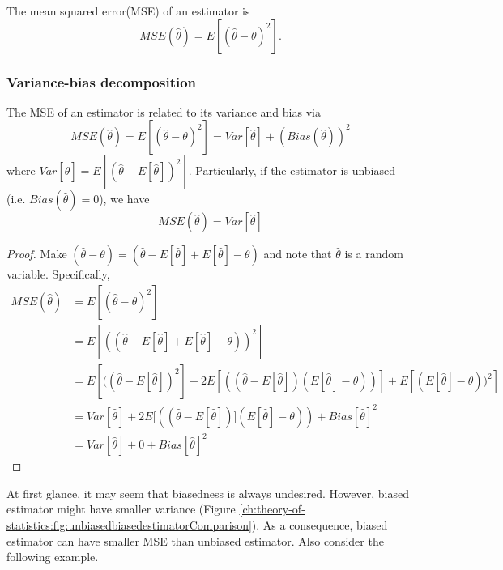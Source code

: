 \begin{refsection}
\begin{definition}
The mean squared error(MSE) of an estimator is $$MSE(\hat{\theta}) = E[(\hat{\theta}-\theta)^2].$$
\end{definition}





\subsubsection{Variance-bias decomposition}
\begin{theorem}
The MSE of an estimator is related to its variance and bias via
\begin{equation}
 MSE(\hat{\theta}) = E[(\hat{\theta}-\theta)^2]=Var[\hat{\theta}] + (Bias(\hat{\theta}))^2
\end{equation}
where $Var[\hat{\theta}] = E[(\hat{\theta} - E[\hat{\theta}])^2]$. Particularly, if the estimator is unbiased (i.e. $Bias(\hat{\theta}) = 0$), we have
$$MSE(\hat{\theta}) =Var[\hat{\theta}]$$
\end{theorem}
\begin{proof}
Make $(\hat{\theta}-\theta) = (\hat{\theta}-E[\hat{\theta}] + E[\hat{\theta}] - \theta)$ and note that $\hat{\theta}$ is a random variable.
Specifically,
\begin{align*}
MSE(\hat{\theta}) & = E[(\hat{\theta}-\theta)^2] \\
				  & = E[((\hat{\theta}-E[\hat{\theta}] + E[\hat{\theta}] - \theta))^2] \\
				  & = E[((\hat{\theta}-E[\hat{\theta}])^2] + 2E[((\hat{\theta}-E[\hat{\theta}])(E[\hat{\theta}] - \theta))] + E[(E[\hat{\theta}] - \theta))^2]\\
				  & = Var[\hat{\theta}] + 2E[((\hat{\theta}-E[\hat{\theta}])](E[\hat{\theta}] - \theta)) + Bias[\hat{\theta}]^2 \\
				  & = Var[\hat{\theta}] + 0 + Bias[\hat{\theta}]^2
\end{align*}	
\end{proof}

\begin{remark}
At first glance, it may seem that biasedness is always undesired. However, biased estimator might have smaller variance (Figure \autoref{ch:theory-of-statistics:fig:unbiasedbiasedestimatorComparison}). As a consequence, biased estimator can have smaller MSE than unbiased estimator. Also consider the following example. 	
\end{remark}






\end{refsection}
